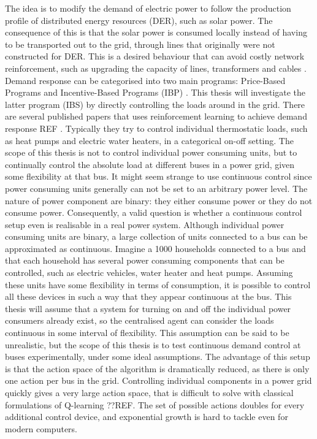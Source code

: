 \documentclass[class=book, crop=false]{standalone}
\begin{document}
The idea is to modify the demand of electric power to follow the production profile of distributed energy resources (DER), such as solar power. The consequence of this is that the solar power is consumed locally instead of having to be transported out to the grid, through lines that originally were not constructed for DER. This is a desired behaviour that can avoid costly network reinforcement, such as upgrading the capacity of lines, transformers and cables \cite{active_network_management}. Demand response can be categorised into two main programs: Price-Based Programs and Incentive-Based Programs (IBP) \cite{demand_response_definition}. This thesis will investigate the latter program (IBS) by directly controlling the loads around in the grid. There are several published papers that uses reinforcement learning to achieve demand response REF \cite{thermo_q_learning}. Typically they try to control individual thermostatic loads, such as heat pumps and electric water heaters, in a categorical on-off setting. The scope of this thesis is not to control individual power consuming units, but to continually control the absolute load at different buses in a power grid, given some flexibility at that bus. It might seem strange to use continuous control since power consuming units generally can not be set to an arbitrary power level. The nature of power component are binary: they either consume power or they do not consume power. Consequently, a valid question is whether a continuous control setup even is realisable in a real power system. Although individual power consuming units are binary, a large collection of units connected to a bus can be approximated as continuous. Imagine a 1000 households connected to a bus and that each household has several power consuming components that can be controlled, such as electric vehicles, water heater and heat pumps. Assuming these units have some flexibility in terms of consumption, it is possible to control all these devices in such a way that they appear continuous at the bus. This thesis will assume that a system for turning on and off the individual power consumers already exist, so the centralised agent can consider the loads continuous in some interval of flexibility. This assumption can be said to be unrealistic, but the scope of this thesis is to test continuous demand control at buses experimentally, under some ideal assumptions. The advantage of this setup is that the action space of the algorithm is dramatically reduced, as there is only one action per bus in the grid. Controlling individual components in a power grid quickly gives a very large action space, that is difficult to solve with classical formulations of Q-learning ??REF. The set of possible actions doubles for every additional control device, and exponential growth is hard to tackle even for modern computers.
\end{document}
